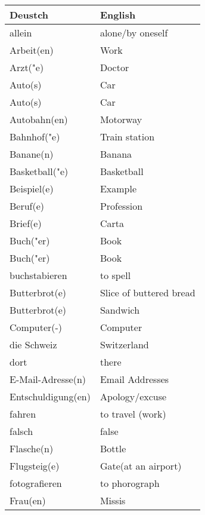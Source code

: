 \documentclass{article}
\renewcommand{\arraystretch}{1}
\begin{document}
\begin{minipage}{0.48\textwidth}
    \centering
    \renewcommand{\arraystretch}{1.5}
    \begin{tabular}{|>{\raggedright\arraybackslash}p{3.5cm}|>{\raggedright\arraybackslash}p{3.5cm}|}
        \hline
        \rowcolor{gray!20} \textbf{Deustch} & \textbf{English} \\
        \hline
        allein & alone/by oneself \\\hline
        Arbeit(en) & Work \\\hline
        Arzt("e) & Doctor \\\hline
        Auto(s) & Car \\\hline
        Auto(s) & Car \\\hline
        Autobahn(en) & Motorway \\\hline
        Bahnhof("e) & Train station \\\hline
        Banane(n) & Banana \\\hline
        Basketball("e) & Basketball \\\hline
        Beispiel(e) & Example \\\hline
        Beruf(e) & Profession \\\hline
        Brief(e) & Carta \\\hline
        Buch("er) & Book \\\hline
        Buch("er) & Book \\\hline
        buchstabieren & to spell \\\hline
        Butterbrot(e) & Slice of buttered bread \\\hline
        Butterbrot(e) & Sandwich \\\hline
        Computer(-) & Computer \\\hline
        die Schweiz & Switzerland \\\hline
        dort & there \\\hline
        E-Mail-Adresse(n) & Email Addresses \\\hline
        Entschuldigung(en) & Apology/excuse \\\hline
        fahren & to travel (work) \\\hline
        falsch & false \\\hline
        Flasche(n) & Bottle \\\hline
        Flugsteig(e) & Gate(at an airport) \\\hline
        fotografieren & to phorograph \\\hline
        Frau(en) & Missis \\\hline

\end{tabular}
\end{minipage}
\end{document}
